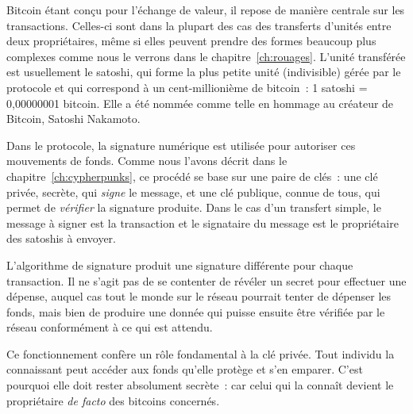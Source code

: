 Bitcoin étant conçu pour l'échange de valeur, il repose de manière centrale sur les transactions. Celles-ci sont dans la plupart des cas des transferts d'unités entre deux propriétaires, même si elles peuvent prendre des formes beaucoup plus complexes comme nous le verrons dans le chapitre~\ref{ch:rouages}. L'unité transférée est usuellement le satoshi, qui forme la plus petite unité (indivisible) gérée par le protocole et qui correspond à un cent-millionième de bitcoin~: 1 satoshi = 0,00000001 bitcoin. Elle a été nommée comme telle en hommage au créateur de Bitcoin, Satoshi Nakamoto.

Dans le protocole, la signature numérique est utilisée pour autoriser ces mouvements de fonds. Comme nous l'avons décrit dans le chapitre~\ref{ch:cypherpunks}, ce procédé se base sur une paire de clés~: une clé privée, secrète, qui \emph{signe} le message, et une clé publique, connue de tous, qui permet de \emph{vérifier} la signature produite. Dans le cas d'un transfert simple, le message à signer est la transaction et le signataire du message est le propriétaire des satoshis à envoyer.

L'algorithme de signature produit une signature différente pour chaque  transaction. Il ne s'agit pas de se contenter de révéler un secret pour effectuer une dépense, auquel cas tout le monde sur le réseau pourrait tenter de dépenser les fonds, mais bien de produire une donnée qui puisse ensuite être vérifiée par le réseau conformément à ce qui est attendu.

Ce fonctionnement confère un rôle fondamental à la clé privée. Tout individu la connaissant peut accéder aux fonds qu'elle protège et s'en emparer. C'est pourquoi elle doit rester absolument secrète~: car celui qui la connaît devient le propriétaire \emph{de facto} des bitcoins concernés.


